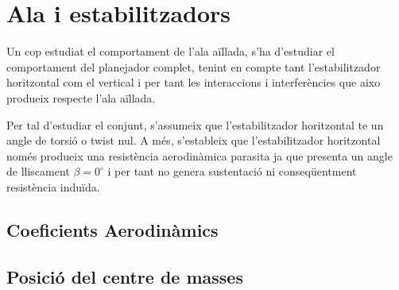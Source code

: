 \chapter{Ala i estabilitzadors}

Un cop estudiat el comportament de l'ala aïllada, s'ha d'estudiar el comportament del planejador complet, tenint en compte tant l'estabilitzador horitzontal com el vertical i per tant les interaccions i interferències que aixo produeix respecte l'ala aïllada. 

Per tal d'estudiar el conjunt, s'assumeix que l'estabilitzador horitzontal te un angle de torsió o twist nul. A més, s'estableix que l'estabilitzador horitzontal només produeix una resistència aerodinàmica parasita ja que presenta un angle de lliscament $\beta=0^{\circ}$ i per tant no genera sustentació ni conseqüentment resistència induïda. 

\section{Coeficients Aerodinàmics}
 
\section{Posició del centre de masses} 
